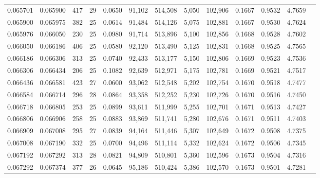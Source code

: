 \begin{tabular}{rrrrrrrrrrrrr}
0.065701 & 0.065900 & 417 &  29 &                                     0.0650 &  91,102 & 514,508 &   5,050 & 102,906 & 0.1667 & 0.9532 & 4.7659 \\
0.065900 & 0.065975 & 382 &  25 &                                     0.0614 &  91,484 & 514,126 &   5,075 & 102,881 & 0.1667 & 0.9530 & 4.7624 \\
0.065976 & 0.066050 & 230 &  25 &                                     0.0980 &  91,714 & 513,896 &   5,100 & 102,856 & 0.1668 & 0.9528 & 4.7602 \\
0.066050 & 0.066186 & 406 &  25 &                                     0.0580 &  92,120 & 513,490 &   5,125 & 102,831 & 0.1668 & 0.9525 & 4.7565 \\
0.066186 & 0.066306 & 313 &  25 &                                     0.0740 &  92,433 & 513,177 &   5,150 & 102,806 & 0.1669 & 0.9523 & 4.7536 \\
0.066306 & 0.066434 & 206 &  25 &                                     0.1082 &  92,639 & 512,971 &   5,175 & 102,781 & 0.1669 & 0.9521 & 4.7517 \\
0.066436 & 0.066581 & 423 &  27 &                                     0.0600 &  93,062 & 512,548 &   5,202 & 102,754 & 0.1670 & 0.9518 & 4.7477 \\
0.066584 & 0.066714 & 296 &  28 &                                     0.0864 &  93,358 & 512,252 &   5,230 & 102,726 & 0.1670 & 0.9516 & 4.7450 \\
0.066718 & 0.066805 & 253 &  25 &                                     0.0899 &  93,611 & 511,999 &   5,255 & 102,701 & 0.1671 & 0.9513 & 4.7427 \\
0.066806 & 0.066906 & 258 &  25 &                                     0.0883 &  93,869 & 511,741 &   5,280 & 102,676 & 0.1671 & 0.9511 & 4.7403 \\
0.066909 & 0.067008 & 295 &  27 &                                     0.0839 &  94,164 & 511,446 &   5,307 & 102,649 & 0.1672 & 0.9508 & 4.7375 \\
0.067008 & 0.067190 & 332 &  25 &                                     0.0700 &  94,496 & 511,114 &   5,332 & 102,624 & 0.1672 & 0.9506 & 4.7345 \\
0.067192 & 0.067292 & 313 &  28 &                                     0.0821 &  94,809 & 510,801 &   5,360 & 102,596 & 0.1673 & 0.9504 & 4.7316 \\
0.067292 & 0.067374 & 377 &  26 &                                     0.0645 &  95,186 & 510,424 &   5,386 & 102,570 & 0.1673 & 0.9501 & 4.7281 \\

\end{tabular}
